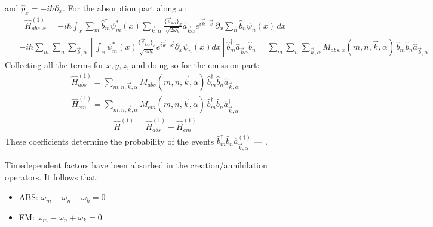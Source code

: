 \documentclass[letterpaper,10pt,english]{jupyterBook}
\begin{document}
\sphinxAtStartPar
and \(\hat p_x=-i\hbar\partial_x\). For the absorption part along \(x\):
\begin{equation*}
\begin{split}
\hat H^{(1)}_{abs,x}=-i\hbar\int_x\sum_m\hat b_m^\dagger\psi_m^*(x)\sum_{\vec k,\alpha}\frac{\{\vec e_{k\alpha}\}_x}{\sqrt{2\omega_k}}\hat a_{\vec k\alpha}e^{i\vec k\cdot\vec x}\,\partial_x\sum_n\hat b_n\psi_n(x)\,dx
\end{split}
\end{equation*}\begin{equation*}
\begin{split}
=-i\hbar\sum_m\sum_n\sum_{\vec k,\alpha}\left[\int_x\psi_m^*(x)\frac{\{\vec e_{k\alpha}\}_x}{\sqrt{2\omega_k}}e^{i\vec k\cdot\vec x}\partial_x\psi_n(x)dx\right]\hat b_m^\dagger\hat a_{\vec k\alpha}\hat b_n
=\sum_m\sum_n\sum_{\vec k,\alpha}M_{abs,x}(m,n,\vec k,\alpha)\,\hat b^\dagger_m\hat b_n\hat a_{\vec k,\alpha}
\end{split}
\end{equation*}
\sphinxAtStartPar
Collecting all the terms for \(x,y,z\), and doing so for the emission part:
\begin{equation*}
\begin{split}
\hat H^{(1)}_{abs}=\sum_{m,n,\vec k,\alpha}M_{abs}(m,n,\vec k,\alpha)\,\hat b_m^\dagger\hat b_n\hat a_{\vec k,\alpha}
\end{split}
\end{equation*}\begin{equation*}
\begin{split}
\hat H^{(1)}_{em}=\sum_{m,n,\vec k,\alpha}M_{em}(m,n,\vec k,\alpha)\,\hat b_m^\dagger\hat b_n\hat a^\dagger_{\vec k,\alpha}
\end{split}
\end{equation*}\begin{equation*}
\begin{split}
\hat H^{(1)}=\hat H^{(1)}_{abs}+\hat H^{(1)}_{em}
\end{split}
\end{equation*}
\sphinxAtStartPar
These coefficients determine the probability of the events \(\hat b^\dagger_m\hat b_n\hat a^{(\dagger)}_{\vec k,\alpha}\) — .

\sphinxAtStartPar
{} Time\sphinxhyphen{}dependent factors have been absorbed in the creation/annihilation operators. It follows that:
\begin{itemize}
\item {} 
\sphinxAtStartPar
ABS: \(\omega_m-\omega_n-\omega_k=0\)

\item {} 
\sphinxAtStartPar
EM: \(\omega_m-\omega_n+\omega_k=0\)

\end{itemize}
\end{document}
